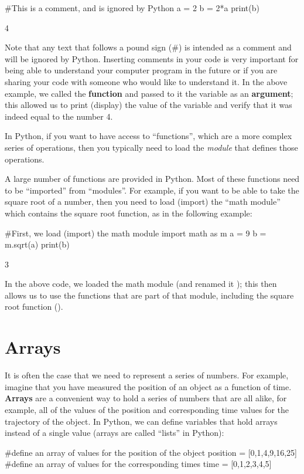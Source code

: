 \begin{python}[caption=Declaring variables in Python] 
#This is a comment, and is ignored by Python
a = 2 
b = 2*a
print(b)
\end{python}
\begin{poutput}
4
\end{poutput}
Note that any text that follows a pound sign (\#) is intended as a comment and will be ignored by Python. Inserting comments in your code is very important for being able to understand your computer program in the future or if you are sharing your code with someone who would like to understand it. In the above example, we called the  \textbf{function} and passed to it the variable  as an \textbf{argument}; this allowed us to print (display) the value of the variable  and verify that it was indeed equal to the number 4.


In Python, if you want to have access to ``functions'', which are a more complex series of operations, then you typically need to load the \textit{module} that defines those operations. 

A large number of functions are provided in Python. Most of these functions need to be ``imported'' from ``modules''. For example, if you want to be able to take the square root of a number, then you need to load (import) the ``math module'' which contains the square root function, as in the following example:
\begin{python}[caption=Using functions from modules] 
#First, we load (import) the math module
import math as m
a = 9
b = m.sqrt(a)
print(b)
\end{python}
\begin{poutput}
3
\end{poutput}
In the above code, we loaded the math module (and renamed it ); this then allows us to use the functions that are part of that module, including the square root function ().

\section{Arrays}
It is often the case that we need to represent a series of numbers. For example, imagine that you have measured the position of an object as a function of time. \textbf{Arrays} are a convenient way to hold a series of numbers that are all alike, for example, all of the values of the position and corresponding time values for the trajectory of the object. In Python, we can define variables that hold arrays instead of a single value (arrays are called ``lists'' in Python):
\begin{python}[caption=Arrays in python]
#define an array of values for the position of the object
position = [0,1,4,9,16,25]
#define an array of values for the corresponding times
time = [0,1,2,3,4,5]
\end{python}

